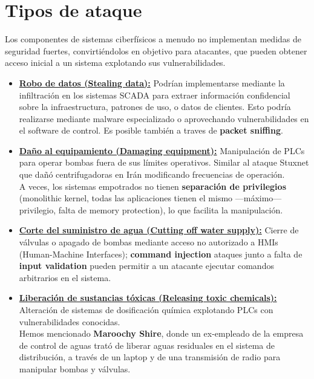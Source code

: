 \section{Tipos de ataque}
Los componentes de sistemas ciberfísicos a menudo no implementan medidas de seguridad fuertes, convirtiéndolos en objetivo para atacantes, que pueden obtener acceso inicial a un sistema explotando sus vulnerabilidades.     
\begin{itemize}
   \item \textbf{\ul{Robo de datos (Stealing data):}} Podrían implementarse mediante la infiltración en los sistemas \textsc{SCADA} para extraer información confidencial sobre la infraestructura, patrones de uso, o datos de clientes. Esto podría realizarse mediante malware especializado o aprovechando vulnerabilidades en el software de control. Es posible también a traves de \textbf{packet sniffing}.\\
   
   \item \textbf{\ul{Daño al equipamiento (Damaging equipment):}} Manipulación de PLCs para operar bombas fuera de sus límites operativos. Similar al ataque Stuxnet que dañó centrifugadoras en Irán modificando frecuencias de operación.\\
   A veces, los sistemas empotrados no tienen \textbf{separación de privilegios} (monolithic kernel, todas las aplicaciones tienen el mismo ---máximo--- privilegio, falta de memory protection), lo que facilita la manipulación.
   
   \item \textbf{\ul{Corte del suministro de agua (Cutting off water supply):}} Cierre de válvulas o apagado de bombas mediante acceso no autorizado a HMIs (Human-Machine Interfaces);
   \textbf{command injection} ataques junto a falta de \textbf{input validation} pueden permitir a un atacante ejecutar comandos arbitrarios en el sistema.
   
   \item \textbf{\ul{Liberación de sustancias tóxicas (Releasing toxic chemicals):}} Alteración de sistemas de dosificación química explotando PLCs con vulnerabilidades conocidas.\\
   Hemos mencionado \textbf{Maroochy Shire}, donde un ex-empleado de la empresa de control de aguas trató de liberar aguas residuales en el sistema de distribución, a través de un laptop y de una transmisión de radio para manipular bombas y válvulas.\\
   

\end{itemize}
